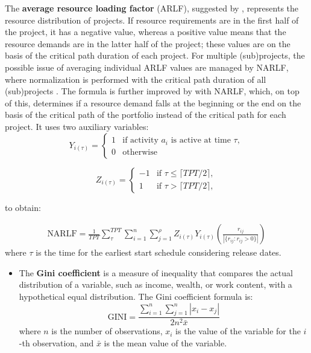 \documentclass[preprint,
3p]{elsarticle} %
\providecommand{\tightlist}{%
  \setlength{\itemsep}{0pt}\setlength{\parskip}{0pt}}
\begin{document}
\begin{appendices}
\begin{itemize}
  The \textbf{average resource loading factor} (ARLF), suggested by
  \citet{kurtulus1982multi}, represents the resource distribution of
  projects. If resource requirements are in the first half of the
  project, it has a negative value, whereas a positive value means that
  the resource demands are in the latter half of the project; these
  values are on the basis of the critical path duration of each project.
  For multiple (sub)projects, the possible issue of averaging individual
  ARLF values are managed by NARLF, where normalization is performed
  with the critical path duration of all (sub)projects
  \citep{browning2010resource}. The formula is further improved by
  \citep{van2020resource} with NARLF, which, on top of this, determines
  if a resource demand falls at the beginning or the end on the basis of
  the critical path of the portfolio instead of the critical path for
  each project. It uses two auxiliary variables: \begin{equation}
  \label{eq:ARLF}
  Y_{i(\tau)}=
  \begin{cases}
  1 & \text{if activity } a_{i} \text{ is active at time } \tau,\\
  0 & \text{otherwise}
  \end{cases}
  \end{equation}
\end{itemize}

\begin{equation}
\label{eq:NARLF1}
Z_{i(\tau)}=
\begin{cases}
-1 & \text{if } \tau \leq \lceil TPT/2 \rceil,\\
1 & \text{if } \tau > \lceil TPT/2 \rceil,
\end{cases}
\end{equation}

to obtain:

\begin{equation}
\label{eq:NARLF}
\begin{split}
\text{NARLF} = \frac{1}{TPT} \sum_{\tau}^{TPT} \sum_{i=1}^{n} \sum_{j=1}^{\rho} Z_{i(\tau)} Y_{i(\tau)} \left( \frac{r_{ij}}{|\{r_{ij}:r_{ij}>0\}|}\right)
\end{split}
\end{equation} \noindent  where \(\tau\) is the time for the earliest
start schedule considering release dates.

\begin{itemize}
\tightlist
\item
  The \textbf{Gini coefficient} is a measure of inequality that compares
  the actual distribution of a variable, such as income, wealth, or work
  content, with a hypothetical equal distribution. The Gini coefficient
  formula is: \begin{equation}
  \text{GINI} = \frac{\sum_{i=1}^n \sum_{j=1}^n |x_i - x_j|}{2n^2 \bar{x}}
  \end{equation} \noindent where \(n\) is the number of observations,
  \(x_i\) is the value of the variable for the \(i\)-th observation, and
  \(\bar{x}\) is the mean value of the variable.
\end{itemize}


\end{appendices}
\end{document}
